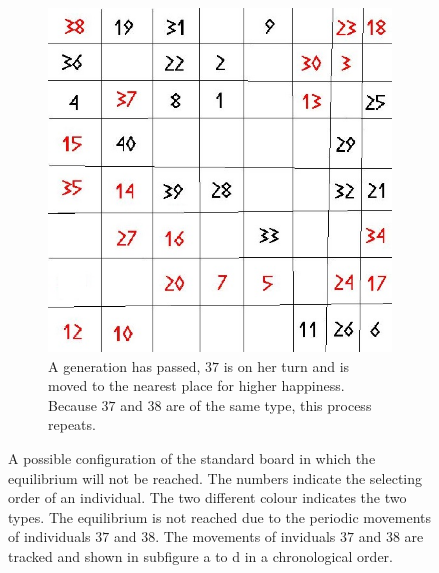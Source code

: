 \begin{figure}[H]
\begin{subfigure}{0.3\textwidth}
        \includegraphics[width=\textwidth]{Tegenvoorbeeld/segregation_tegenvb_3.jpg}
        \caption{A generation has passed, $37$ is on her turn and is moved to the nearest place for higher happiness. Because $37$ and $38$ are of the same type, this process repeats. }
        \label{fig:movement4}
    \end{subfigure}
    \caption{A possible configuration of the standard board in which the equilibrium will not be reached. The numbers indicate the selecting order of an individual. The two different colour indicates the two types. The equilibrium is not reached due to the periodic movements of individuals $37$ and $38$. The movements of inviduals $37$ and $38$ are tracked and shown in subfigure a to d in a chronological order.}\label{fig:equilibrium counterexample}
\end{figure}



